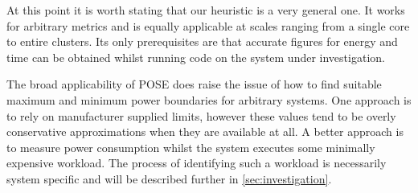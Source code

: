 

\todo{} At this point it is worth stating that our heuristic is a very general one.
It works for arbitrary metrics and is equally applicable at scales ranging from a single core to entire clusters.
Its only prerequisites are that accurate figures for energy and time can be obtained whilst running code on the system under investigation.

The broad applicability of POSE does raise the issue of how to find suitable maximum and minimum power boundaries for arbitrary systems. 
One approach is to rely on manufacturer supplied limits, however these values tend to be overly conservative approximations when they are available at all.
A better approach is to measure power consumption whilst the system executes some minimally expensive workload. 
The process of identifying such a workload is necessarily system specific and will be described further in \autoref{sec:investigation}.
